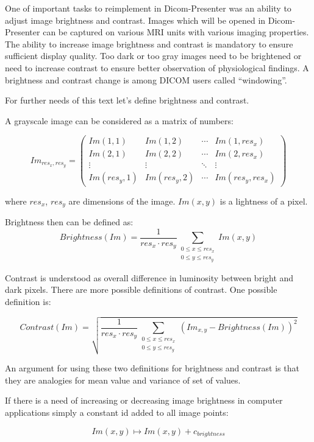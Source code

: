 One of important tasks to reimplement in Dicom-Presenter was an ability to adjust image brightness and contrast. Images which will be opened in Dicom-Presenter can be captured on various MRI units with various imaging properties. The ability to increase image brightness and contrast is mandatory to ensure sufficient display quality. Too dark or too gray images need to be brightened or need to increase contrast to ensure better observation of physiological findings. A brightness and contrast change is among DICOM users called ``windowing''.

For further needs of this text let's define brightness and contrast. 

A grayscale image can be considered as a matrix of numbers: 

\[
 Im_{res_{x},res_{y}} =
 \begin{pmatrix}
  Im(1,1) & Im(1,2) & \cdots & Im(1,res_{x}) \\
  Im(2,1) & Im(2,2) & \cdots & Im(2,res_{x}) \\
  \vdots  & \vdots  & \ddots & \vdots  \\
  Im(res_{y},1) & Im(res_{y},2) & \cdots & Im(res_{y},res_{x})
 \end{pmatrix}
\]

where $ res_{x} $, $res_{y}$ are dimensions of the image. $Im(x,y)$ is a lightness of a pixel.

Brightness then can be defined as:
\[
  Brightness(Im) = \frac{1}{res_{x}  \cdot res_{y}}\sum_{\substack{0 \leq x \leq res_{x} \\ 0 \leq y \leq res_{y}}} Im(x,y)
\]

Contrast is understood as overall difference in luminosity between bright and dark pixels. There are more possible definitions of contrast. One possible definition is:

\[
Contrast(Im) = \sqrt{\frac{1}{res_{x} \cdot res_{y}}\sum_{\substack{ 0 \leq x \leq res_{x} \\ 0 \leq y \leq res_{y} }}(Im_{x,y}-Brightness(Im))^2}
\]

An argument for using these two definitions for brightness and contrast is that they are analogies for mean value and variance of set of values.

If there is a need of increasing or decreasing image brightness in computer applications simply a constant id added to all image points:

\begin{equation}
\label{brightness}
  Im(x,y) \longmapsto Im(x,y) + c_{brightness} 
\end{equation}

